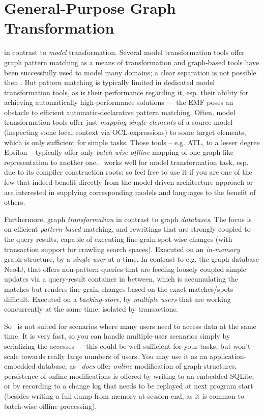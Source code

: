\section{General-Purpose Graph Transformation}
in contrast to \emph{model} transformation.
Several model transformation tools offer graph pattern matching as a means of transformation and graph-based tools have been successfully used to model many domains; a clear separation is not possible then \cite{Jakumeit2013}.
But pattern matching is typically limited in dedicated model transformation tools, as is their performance regarding it, esp. their ability for achieving automatically high-performance solutions --- the EMF poses an obstacle to efficient automatic-declarative pattern matching.
Often, model transformation tools offer just \emph{mapping single elements} of a source model (inspecting some local context via OCL-expressions) to some target elements, which is only sufficient for simple tasks.
Those tools -- e.g. ATL\cite{atl}, to a lesser degree Epsilon\cite{epsilon} -- typically offer only \emph{batch-wise offline} mapping of one graph-like representation to another one.
\GrG\ works well for model transformation task, esp. due to its compiler construction roots; so feel free to use it if you are one of the few that indeed benefit directly from the model driven architecture approach or are interested in supplying corresponding models and languages to the benefit of others. 

Furthermore, graph \emph{transformation} in contrast to graph \emph{databases}.
The focus is on efficient \emph{pattern-based} matching, and rewritings that are strongly coupled to the query results, capable of executing fine-grain spot-wise changes (with transaction support for crawling search spaces). 
Executed on an \emph{in-memory} graph-structure, by a \emph{single user} at a time.
In contrast to e.g. the graph database Neo4J\cite{neo}, that offers non-pattern queries that are feeding loosely coupled simple updates via a query-result container in between, which is accumulating the matches but renders fine-grain changes based on the exact matches/spots difficult.
Executed on a \emph{backing-store}, by \emph{multiple users} that are working concurrently at the same time, isolated by transactions.

So \GrG\ is not suited for scenarios where many users need to access data at the same time. 
It is very fast, so you can handle multiple-user scenarios simply by serializing the accesses --- this could be well sufficient for your tasks, but won't scale towards really large numbers of users.
You may use it as an application-embedded database, as
\GrG\ \emph{does} offer \emph{online} modification of graph-structures,
persistence of online modifications is offered by writing to an embedded SQLite,
or by recording to a change log that needs to be replayed at next program start
(besides writing a full dump from memory at session end, as it is common to batch-wise offline processing).

